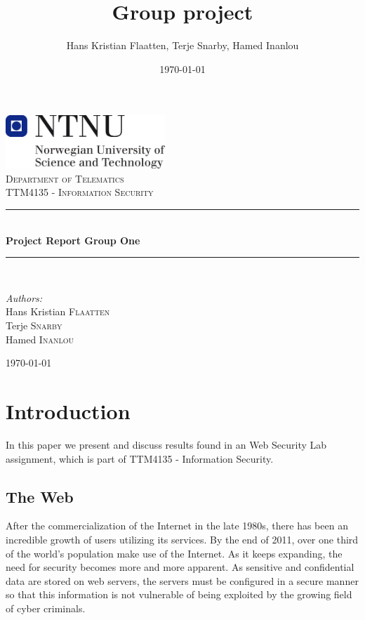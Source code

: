 \documentclass[a4paper, 12pt]{article}
\title{Group project}
\author{Hans Kristian Flaatten, Terje Snarby, Hamed Inanlou }
\date{\today}
\begin{document}
\begin{titlepage}
\begin{center}
\includegraphics[width=0.45\textwidth]{./img/NTNU-logo.png}\\[5cm]
\textsc{\large Department of Telematics}\\[0.2cm]
\textsc{\Large TTM4135 - Information Security}\\[0.5cm]

\rule{\linewidth}{0.2mm} \\[0.4cm]
{ \LARGE \bfseries Project Report Group One}\\[0.2cm]
\rule{\linewidth}{0.2mm} \\[1.5cm]

\begin{minipage}{0.4\textwidth}
\begin{flushleft} \large
\emph{Authors:}\\
Hans Kristian \textsc{Flaatten}\\
Terje \textsc{Snarby}\\
Hamed \textsc{Inanlou}
\end{flushleft}
\end{minipage}

\vfill
{\large \today}
\end{center}
\end{titlepage}


\section{Introduction}
In this paper we present and discuss results found in an Web Security Lab assignment, which is part of TTM4135 - Information Security.

\subsection{The Web}
After the commercialization of the Internet in the late 1980s, there has been an incredible growth of users utilizing its services. By the end of 2011, over one third of the world’s population make use of the Internet. As it keeps expanding, the need for security becomes more and more apparent. As sensitive and confidential data are stored on web servers, the servers must be configured in a secure manner so that this information is not vulnerable of being exploited by the growing field of cyber criminals.
\end{document}
